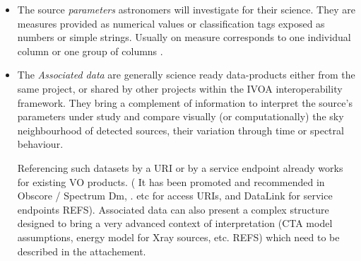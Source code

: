 \documentclass[11pt,a4paper]{ivoa}
\begin{document}
\begin{itemize}
  \begin{itemize}
    \item The source \emph{parameters} astronomers will investigate for their science. They are measures provided as numerical values or classification tags exposed as numbers or simple strings. Usually on measure corresponds to one individual column or one group of columns .
     \item The \emph{Associated data} are generally science ready data-products either from the same project, or shared by other projects within the IVOA interoperability framework.
They bring a complement of information to interpret the source's  parameters under study and compare visually (or computationally) the sky neighbourhood of detected sources, their variation through time or spectral behaviour.

Referencing such datasets by a URI or by a service endpoint already works for existing VO products. ( It has been promoted and recommended in Obscore / Spectrum Dm, . etc for access URIs, and DataLink for service endpoints REFS).
Associated data can also present a complex structure designed to bring a very advanced context of interpretation (CTA model assumptions, energy model for Xray sources, etc. REFS) which need to be described in the attachement.
 \end{itemize}



\end{itemize}
\end{document}
